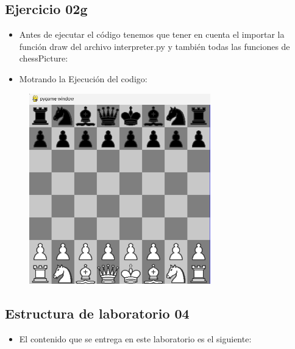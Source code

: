 \documentclass{article}
\begin{document}
	\subsection{Ejercicio 02g}
	\begin{itemize}	
		\item Antes de ejecutar el código tenemos que tener en cuenta el importar la función draw del archivo interpreter.py y también todas las funciones de chessPicture:
	\end{itemize}	

		

	\begin{itemize}	
		\item Motrando la Ejecución del codigo:
	\end{itemize}	

	\begin{figure}[H]
		\centering
		\includegraphics[width=0.7\textwidth,keepaspectratio]{img/Ejercicio2g.png}
	\end{figure}

	\subsection{Estructura de laboratorio 04}
	\begin{itemize}	
		\item El contenido que se entrega en este laboratorio es el siguiente:
	\end{itemize}
\end{document}
